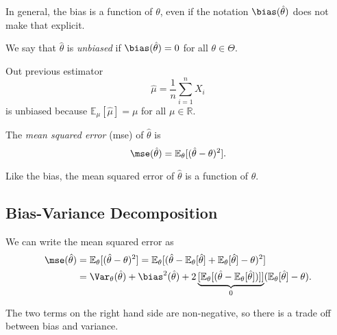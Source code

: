 \documentclass[12pt]{article}
\begin{document}
\begin{remark}
	In general, the bias is a function of $\theta$, even if the notation $\bias(\hat \theta)$ does not make that explicit.
\end{remark}

\begin{definition}
	We say that $\hat \theta$ is \emph{unbiased} if $\bias(\hat \theta) = 0$ for all $\theta \in \Theta$.
\end{definition}

\begin{exbox}
	Out previous estimator 
	\[
	\hat \mu = \frac{1}{n} \sum_{i = 1}^{n}X_i
	\]
	is unbiased because $\mathbb{E}_\mu[\hat \mu] = \mu$ for all $\mu \in \mathbb{R}$.
\end{exbox}

\begin{definition}
	The \emph{mean squared error} (mse) of $\hat \theta$ is
	\[
	\mse(\hat \theta) = \mathbb{E}_\theta[(\hat \theta - \theta)^2]
	.\]
\end{definition}

Like the bias, the mean squared error of $\hat \theta$ is a function of $\theta$.

\subsection{Bias-Variance Decomposition}
\label{sub:bias_variance_decomposition}

We can write the mean squared error as
\begin{align*}
	\mse(\hat \theta) &= \mathbb{E}_\theta[(\hat \theta - \theta)^2] = \mathbb{E}_\theta[(\hat \theta - \mathbb{E}_\theta[\hat \theta] + \mathbb{E}_\theta[\hat \theta] - \theta)^2] \\
			  &= \Var_{\theta}(\hat \theta) + \bias^2(\hat \theta) + 2\underbrace{[\mathbb{E}_\theta[(\hat \theta - \mathbb{E}_\theta[\hat \theta])]]}_{0}(\mathbb{E}_\theta[\hat \theta] - \theta).
\end{align*}

The two terms on the right hand side are non-negative, so there is a trade off between bias and variance.
\end{document}
